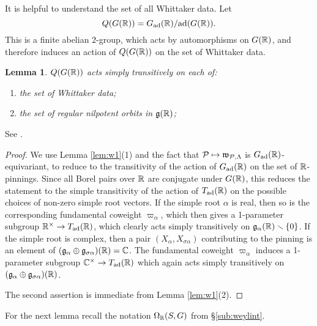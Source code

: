 \documentclass{article}
\newtheorem{lem}[thm]{Lemma}
\theoremstyle{definition}
\numberwithin{equation}{section}
\renewcommand{\-}{\hyp{}}
\newcommand{\warn}[1]{{\leavevmode\color{red}[#1]}}
\newcommand{\g}{\mathfrak g}
\newcommand{\w}{\mathfrak w}
\begin{document}
It is helpful to understand the set of all Whittaker data.
Let
$$
Q(G(\mathbb{R}))=G_{\mathrm{ad}}(\mathbb{R})/\mathrm{ad}(G(\mathbb{R})).
$$
This is a finite abelian $2$-group, which 
acts by automorphisms on $G(\mathbb{R})$, and therefore  induces an action of $Q(G(\mathbb{R}))$ on the set of Whittaker data.

\begin{lem}
\label{l:Q}
	$Q(G(\mathbb{R}))$ acts simply transitively on each of:
\begin{enumerate}
\item the set of Whittaker data;
\item the set of regular nilpotent orbits in $\g(\R)$;
\end{enumerate}
\end{lem}

See \cite[Lemma 14.14]{ABV92}.

\begin{proof}
	  We use Lemma \ref{lem:w1}(1) and the fact that $\mc{P} \mapsto \w_{\mc{P},\Lambda}$ is $G_{\textrm{ad}}(\mathbb{R})$-equivariant, to reduce to the transitivity of the action of $G_{\textrm{ad}}(\mathbb{R})$ on the set of $\mathbb{R}$-pinnings. Since all Borel pairs over $\mathbb{R}$ are conjugate under $G(\mathbb{R})$, this reduces the statement to the simple transitivity of the action of $T_{\textrm{ad}}(\mathbb{R})$ on the possible choices of non-zero simple root vectors. If the simple root $\alpha$ is real, then so is the corresponding fundamental coweight $\varpi_\alpha$, which then gives a 1-parameter subgroup $\mathbb{R}^\times \to T_{\textrm{ad}}(\mathbb{R})$, which clearly acts simply transitively on $\mathfrak{g}_\alpha(\mathbb{R}) \smallsetminus \{0\}$. If the simple root is complex, then a pair $(X_\alpha,X_{\sigma\alpha})$ contributing to the pinning is an element of $(\mathfrak{g}_\alpha \oplus \mathfrak{g}_{\sigma\alpha})(\mathbb{R}) = \mathbb{C}$. The fundamental coweight $\varpi_\alpha$ induces a 1-parameter subgroup $\mathbb{C}^\times \to T_{\textrm{ad}}(\mathbb{R})$ which again acts simply transitively on $(\mathfrak{g}_\alpha \oplus \mathfrak{g}_{\sigma\alpha})(\mathbb{R})$.

The second assertion is immediate from Lemma \ref{lem:w1}(2).
\end{proof}

For the next lemma recall the notation $\Omega_{\mathbb{R}}(S,G)$ from \S\ref{sub:weylint}.
\end{document}
